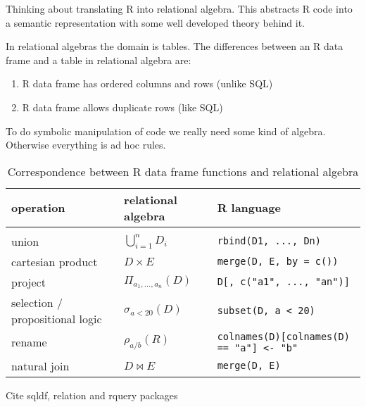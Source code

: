 \documentclass[12pt]{article}
\begin{document}
Thinking about translating R into relational algebra.
This abstracts R code into a semantic representation with some well
developed theory behind it.

In relational algebras the domain is tables. The differences between an R
data frame and a table in relational algebra are:

\begin{enumerate}
    \item R data frame has ordered columns and rows (unlike SQL)
    \item R data frame allows duplicate rows (like SQL)
\end{enumerate}

To do symbolic manipulation of code we really need some kind of algebra.
Otherwise everything is ad hoc rules.



\begin{table}[]
\centering
    \caption{Correspondence between R data frame functions and relational
    algebra}
\label{tab-correspond}
\begin{tabular}{lll}
    \textbf{operation} & \textbf{relational algebra} & \textbf{R language}
    \\
\hline
    \\ union  & $\bigcup_{i=1}^n D_i$
        & \texttt{rbind(D1, ..., Dn)}
    \\ cartesian product   & $D \times E$
        & \texttt{merge(D, E, by = c())}
    \\ project & ${\displaystyle \Pi _{a_{1},\ldots ,a_{n}}(D)}$
        & \texttt{D[, c("a1", ..., "an")]}
    \\ selection / propositional logic & $\sigma_{a < 20} (D)$
        & \texttt{subset(D, a < 20)}
    \\ rename & $\rho_{a / b}(R)$
        & \texttt{colnames(D)[colnames(D) == "a"] <- "b"}
    \\ natural join & $D \Join E$
        & \texttt{merge(D, E)}
\end{tabular}
\end{table}


Cite sqldf, relation and rquery packages
\end{document}
